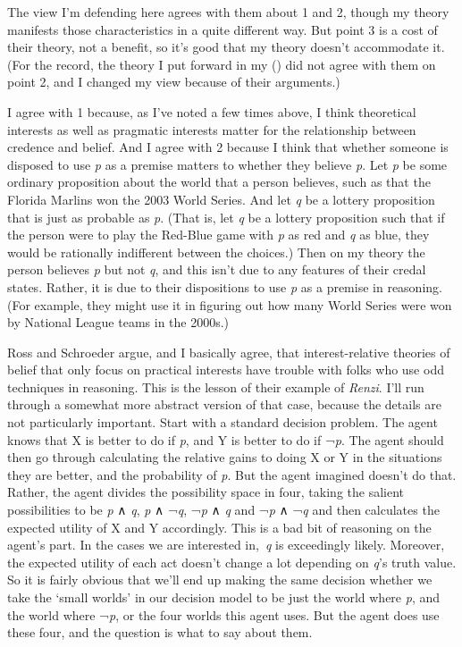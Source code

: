 \documentclass[
  12pt,
  letterpaper,
]{scrbook}
\begin{document}
The view I'm defending here agrees with them about 1 and 2, though my
theory manifests those characteristics in a quite different way. But
point 3 is a cost of their theory, not a benefit, so it's good that my
theory doesn't accommodate it. (For the record, the theory I put forward
in my () did not agree with
them on point 2, and I changed my view because of their arguments.)

I agree with 1 because, as I've noted a few times above, I think
theoretical interests as well as pragmatic interests matter for the
relationship between credence and belief. And I agree with 2 because I
think that whether someone is disposed to use \emph{p} as a premise
matters to whether they believe \emph{p}. Let \emph{p} be some ordinary
proposition about the world that a person believes, such as that the
Florida Marlins won the 2003 World Series. And let \emph{q} be a lottery
proposition that is just as probable as \emph{p}. (That is, let \emph{q}
be a lottery proposition such that if the person were to play the
Red-Blue game with \emph{p} as red and \emph{q} as blue, they would be
rationally indifferent between the choices.) Then on my theory the
person believes \emph{p} but not \emph{q}, and this isn't due to any
features of their credal states. Rather, it is due to their dispositions
to use \emph{p} as a premise in reasoning. (For example, they might use
it in figuring out how many World Series were won by National League
teams in the 2000s.)

Ross and Schroeder argue, and I basically agree, that interest-relative
theories of belief that only focus on practical interests have trouble
with folks who use odd techniques in reasoning. This is the lesson of
their example of \emph{Renzi}. I'll run through a somewhat more abstract
version of that case, because the details are not particularly
important. Start with a standard decision problem. The agent knows that
X is better to do if \emph{p}, and Y is better to do if ¬\emph{p}. The
agent should then go through calculating the relative gains to doing X
or Y in the situations they are better, and the probability of \emph{p}.
But the agent imagined doesn't do that. Rather, the agent divides the
possibility space in four, taking the salient possibilities to be
\emph{p} ∧ \emph{q}, \emph{p} ∧ ¬\emph{q}, ¬\emph{p} ∧ \emph{q} and
¬\emph{p} ∧ ¬\emph{q} and then calculates the expected utility of X and
Y accordingly. This is a bad bit of reasoning on the agent's part. In
the cases we are interested in,~\emph{q} is exceedingly likely.
Moreover, the expected utility of each act doesn't change a lot
depending on \emph{q}'s truth value. So it is fairly obvious that we'll
end up making the same decision whether we take the `small worlds' in
our decision model to be just the world where \emph{p}, and the world
where ¬\emph{p}, or the four worlds this agent uses. But the agent does
use these four, and the question is what to say about them.
\end{document}
